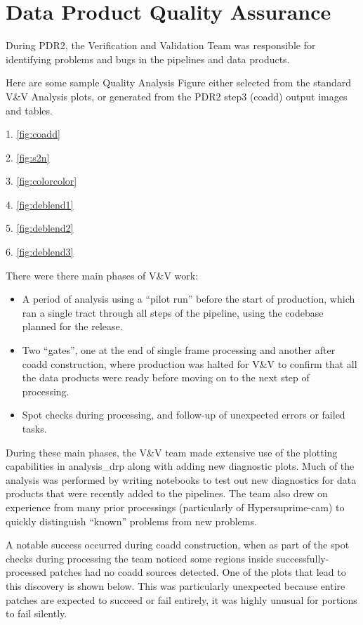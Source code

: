 \section{Data Product Quality Assurance} \label{sec:qa}

During PDR2, the Verification and Validation Team was responsible for identifying problems and bugs
in the pipelines and data products. 

Here are some sample Quality Analysis Figure either selected from the 
standard V\&V Analysis plots, or generated from the PDR2 step3 (coadd) 
output images and tables.

1. \ref{fig:coadd}  


2. \ref{fig:s2n}

3. \ref{fig:colorcolor}

4. \ref{fig:deblend1}

5. \ref{fig:deblend2}

6. \ref{fig:deblend3}

There were there main phases of V\&V work:

\begin{itemize}
\item A period of analysis using a “pilot run” before the start of production, which ran a single
tract through all steps of the pipeline, using the codebase planned for the release.
\item Two “gates”, one at the end of single frame processing and another after coadd construction,
where production was halted for V\&V to confirm that all the data products were ready before moving
on to the next step of processing.
\item Spot checks during processing, and follow-up of unexpected errors or failed tasks.
\end{itemize}

During these main phases, the V\&V team made extensive use of the plotting capabilities in
analysis\_drp along with adding new diagnostic plots. Much of the analysis was performed by writing
notebooks to test out new diagnostics for data products that were recently added to the pipelines.
The team also drew on experience from many prior processings (particularly of Hypersuprime-cam) to
quickly distinguish ``known'' problems from new problems.

A notable success occurred during coadd construction, when as part of the spot checks during
processing the team noticed some regions inside successfully-processed patches had no coadd sources
detected. One of the plots that lead to this discovery is shown below. This was particularly
unexpected because entire patches are expected to succeed or fail entirely, it was highly unusual
for portions to fail silently.


